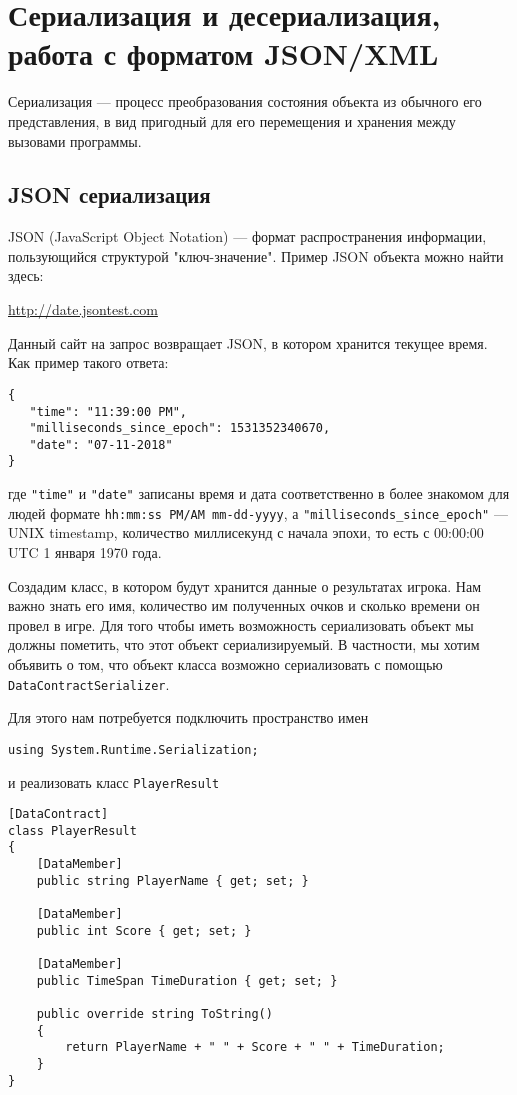 \section{Сериализация и десериализация, работа с форматом JSON/XML}

Сериализация — процесс преобразования состояния объекта из обычного его представления, в вид пригодный для его перемещения и хранения между вызовами программы.

\subsection{JSON сериализация} \label{jsonxmlserialization}

JSON (JavaScript Object Notation) — формат распространения информации, пользующийся структурой "ключ-значение". Пример JSON объекта можно найти здесь:

\url{http://date.jsontest.com}

Данный сайт на запрос возвращает JSON, в котором хранится текущее время. Как пример такого ответа:

\begin{verbatim}
{
   "time": "11:39:00 PM",
   "milliseconds_since_epoch": 1531352340670,
   "date": "07-11-2018"
}
\end{verbatim}

где \texttt{"time"} и \texttt{"date"} записаны время и дата соответственно в более знакомом для людей формате \texttt{hh:mm:ss PM/AM mm-dd-yyyy}, а \texttt{"milliseconds_since_epoch"} — UNIX timestamp, количество миллисекунд с начала эпохи, то есть с 00:00:00 UTC 1 января 1970 года.  

Создадим класс, в котором будут хранится данные о результатах игрока. Нам важно знать его имя, количество им полученных очков и сколько времени он провел в игре. Для того чтобы иметь возможность сериализовать объект мы должны пометить, что этот объект сериализируемый. В частности, мы хотим объявить о том, что объект класса возможно сериализовать с помощью \texttt{DataContractSerializer}. 

Для этого нам потребуется подключить пространство имен

\begin{verbatim}
using System.Runtime.Serialization;
\end{verbatim}

и реализовать класс \texttt{PlayerResult}

\begin{verbatim}
[DataContract]
class PlayerResult 
{
    [DataMember] 
    public string PlayerName { get; set; }

    [DataMember] 
    public int Score { get; set; }

    [DataMember] 
    public TimeSpan TimeDuration { get; set; }

    public override string ToString()
    {
        return PlayerName + " " + Score + " " + TimeDuration;
    }
}
\end{verbatim}

